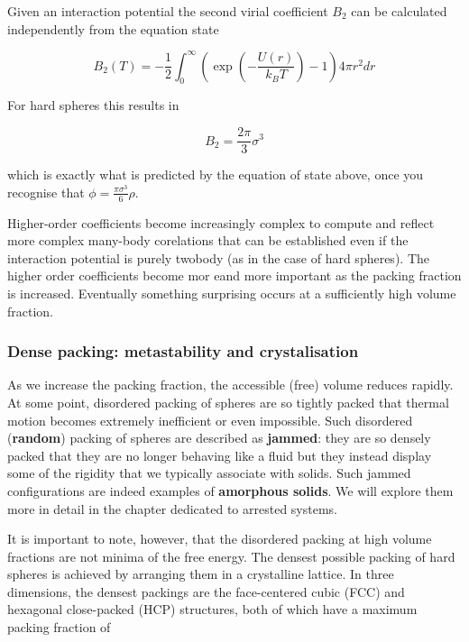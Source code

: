 \documentclass[
  letterpaper,
  enabledeprecatedfontcommands]{report}
\begin{document}
Given an interaction potential the second virial coefficient \(B_2\) can
be calculated independently from the equation state

\[
B_2(T)=-\frac{1}{2} \int_0^{\infty}\left(\exp \left(-\frac{U(r)}{k_B T}\right)-1\right) 4 \pi r^2 d r 
\]

For hard spheres this results in

\[
B_2 =  \frac{2\pi}{3} \sigma^3
\]

which is exactly what is predicted by the equation of state above, once
you recognise that \(\phi = \frac{\pi\sigma^3}{6}\rho\).


Higher-order coefficients become increasingly complex to compute and
reflect more complex many-body corelations that can be established even
if the interaction potential is purely twobody (as in the case of hard
spheres). The higher order coefficients become mor eand more important
as the packing fraction is increased. Eventually something surprising
occurs at a sufficiently high volume fraction.

\subsubsection*{Dense packing: metastability and
crystalisation}\label{dense-packing-metastability-and-crystalisation}

As we increase the packing fraction, the accessible (free) volume
reduces rapidly. At some point, disordered packing of spheres are so
tightly packed that thermal motion becomes extremely inefficient or even
impossible. Such disordered (\textbf{random}) packing of spheres are
described as \textbf{jammed}: they are so densely packed that they are
no longer behaving like a fluid but they instead display some of the
rigidity that we typically associate with solids. Such jammed
configurations are indeed examples of \textbf{amorphous solids}. We will
explore them more in detail in the chapter dedicated to arrested
systems.

It is important to note, however, that the disordered packing at high
volume fractions are not minima of the free energy. The densest possible
packing of hard spheres is achieved by arranging them in a crystalline
lattice. In three dimensions, the densest packings are the face-centered
cubic (FCC) and hexagonal close-packed (HCP) structures, both of which
have a maximum packing fraction of
\end{document}
